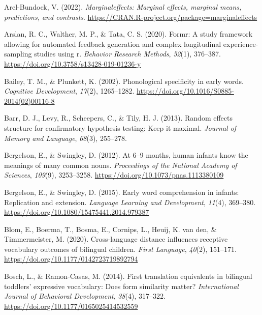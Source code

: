\documentclass[
]{article}
\newlength{\cslhangindent}
\newlength{\cslentryspacingunit} %
\newenvironment{CSLReferences}[2] %
 {%
  \setlength{\parindent}{0pt}
  \ifodd #1
  \let\oldpar\par
  \def\par{\hangindent=\cslhangindent\oldpar}
  \fi
  \setlength{\parskip}{#2\cslentryspacingunit}
 }%
 {}
\begin{document}
\begin{CSLReferences}{1}{0}
\leavevmode{}%
Arel-Bundock, V. (2022). \emph{Marginaleffects: Marginal effects,
marginal means, predictions, and contrasts}.
\url{https://CRAN.R-project.org/package=marginaleffects}

\leavevmode{}%
Arslan, R. C., Walther, M. P., \& Tata, C. S. (2020). Formr: A study
framework allowing for automated feedback generation and complex
longitudinal experience-sampling studies using r. \emph{Behavior
Research Methods}, \emph{52}(1), 376--387.
\url{https://doi.org/10.3758/s13428-019-01236-y}

\leavevmode{}%
Bailey, T. M., \& Plunkett, K. (2002). Phonological specificity in early
words. \emph{Cognitive Development}, \emph{17}(2), 1265--1282.
\url{https://doi.org/10.1016/S0885-2014(02)00116-8}

\leavevmode{}%
Barr, D. J., Levy, R., Scheepers, C., \& Tily, H. J. (2013). Random
effects structure for confirmatory hypothesis testing: Keep it maximal.
\emph{Journal of Memory and Language}, \emph{68}(3), 255--278.

\leavevmode{}%
Bergelson, E., \& Swingley, D. (2012). At 6--9 months, human infants
know the meanings of many common nouns. \emph{Proceedings of the
National Academy of Sciences}, \emph{109}(9), 3253--3258.
\url{https://doi.org/10.1073/pnas.1113380109}

\leavevmode{}%
Bergelson, E., \& Swingley, D. (2015). Early word comprehension in
infants: Replication and extension. \emph{Language Learning and
Development}, \emph{11}(4), 369--380.
\url{https://doi.org/10.1080/15475441.2014.979387}

\leavevmode{}%
Blom, E., Boerma, T., Bosma, E., Cornips, L., Heuij, K. van den, \&
Timmermeister, M. (2020). Cross-language distance influences receptive
vocabulary outcomes of bilingual children. \emph{First Language},
\emph{40}(2), 151--171. \url{https://doi.org/10.1177/0142723719892794}

\leavevmode{}%
Bosch, L., \& Ramon-Casas, M. (2014). First translation equivalents in
bilingual toddlers' expressive vocabulary: Does form similarity matter?
\emph{International Journal of Behavioral Development}, \emph{38}(4),
317--322. \url{https://doi.org/10.1177/0165025414532559}


\end{CSLReferences}
\end{document}
